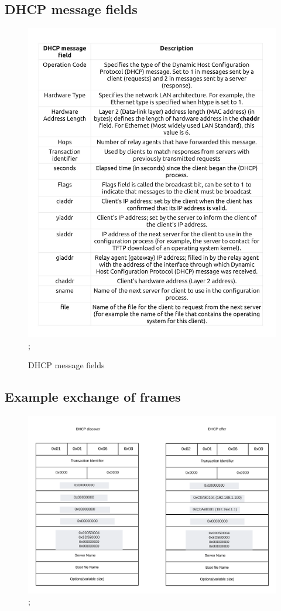 \documentclass[12pt]{article}
\begin{document}
\begin{sloppypar}
\subsection{DHCP message fields}
%
\begin{figure}[!h]
	\centering
	\includegraphics[width=.80\textwidth]{images/msg_fields.jpg};
	\caption{DHCP message fields}
\end{figure}
%

\newpage
\subsection{Example exchange of frames}
%
\begin{figure}[!h]
	\centering
	\includegraphics[width=.70\textwidth]{images/packet.png};
	

\end{figure}
\end{sloppypar}
\end{document}
